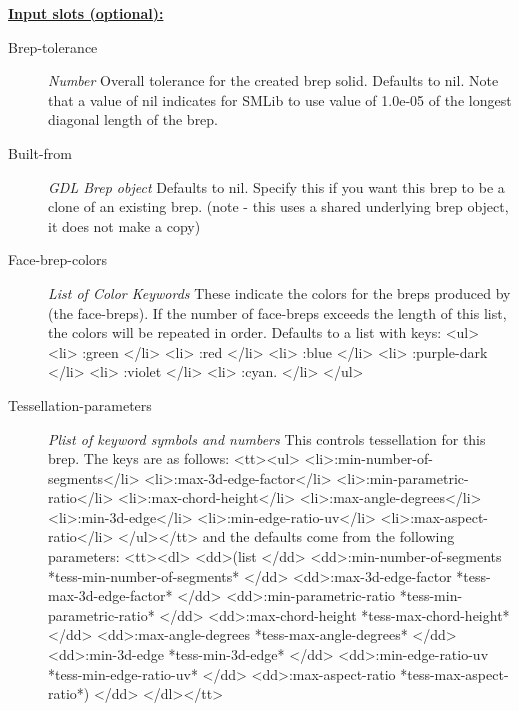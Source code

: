 \documentclass [11pt]{book}
\begin{document}
\begin{itemize}
\begin{description}
\end{description}








\textbf{
\underline{Input slots (optional):}}

\begin{description}

\item [Brep-tolerance]
\emph{Number} Overall tolerance for the created brep solid. Defaults to nil.
Note that a value of nil indicates for SMLib to use value of 1.0e-05 of the
longest diagonal length of the brep.


\item [Built-from]
\emph{GDL Brep object} Defaults to nil.
Specify this if you want this brep to be a clone of an existing brep. (note -
this uses a shared underlying brep object, it does not make a copy)


\item [Face-brep-colors]
\emph{List of Color Keywords} These indicate the colors
for the breps produced by (the face-breps). If the
number of face-breps exceeds the length of this list,
the colors will be repeated in order.
Defaults to a list with keys:
<ul>
<li> :green </li>
<li> :red </li>
<li> :blue </li>
<li> :purple-dark </li>
<li> :violet </li>
<li> :cyan. </li>
</ul>


\item [Tessellation-parameters]
\emph{Plist of keyword symbols and numbers} This controls tessellation for this brep.
The keys are as follows:
<tt><ul>
<li>:min-number-of-segments</li>
<li>:max-3d-edge-factor</li>
<li>:min-parametric-ratio</li>
<li>:max-chord-height</li>
<li>:max-angle-degrees</li>
<li>:min-3d-edge</li>
<li>:min-edge-ratio-uv</li>
<li>:max-aspect-ratio</li>
</ul></tt>
and the defaults come from the following parameters:
<tt><dl>
<dd>(list </dd>
<dd>:min-number-of-segments *tess-min-number-of-segments* </dd>
<dd>:max-3d-edge-factor *tess-max-3d-edge-factor* </dd>
<dd>:min-parametric-ratio *tess-min-parametric-ratio* </dd>
<dd>:max-chord-height *tess-max-chord-height* </dd>
<dd>:max-angle-degrees *tess-max-angle-degrees* </dd>
<dd>:min-3d-edge *tess-min-3d-edge* </dd>
<dd>:min-edge-ratio-uv *tess-min-edge-ratio-uv* </dd>
<dd>:max-aspect-ratio *tess-max-aspect-ratio*) </dd>
</dl></tt>


\end{description}







\end{itemize}
\end{document}
